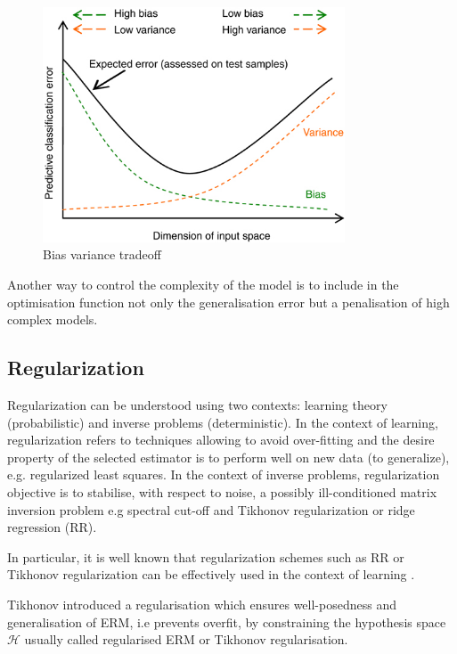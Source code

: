 \begin{figure}[!h]
  \centering
  \includegraphics[width=0.8\textwidth]{img/biasvariancetradeoff}
  \caption{Bias variance tradeoff}
  \label{fig:bvtradeoff}
\end{figure}

Another way to control the complexity of the model is to include in the optimisation function not only the generalisation error but a penalisation of high complex models. 


\subsection{Regularization}\label{sec:regularization}

Regularization can be understood using two contexts: learning theory
(probabilistic) and inverse problems (deterministic). In the context of
learning, regularization refers to techniques allowing to avoid over-fitting and
the desire property of the selected estimator is to perform well on new data (to
generalize), e.g. regularized least squares. In the context of inverse problems,
regularization objective is to stabilise, with respect to noise, a possibly
ill-conditioned matrix inversion problem e.g spectral cut-off and Tikhonov
regularization or ridge regression (RR)\cite{ tikhonov1977}.

In particular, it is well known that regularization schemes such as RR or
Tikhonov regularization can be effectively used in the context of learning
\cite{vito2005}.

Tikhonov introduced a regularisation which ensures well-posedness and
generalisation of ERM, i.e prevents overfit, by constraining the hypothesis
space $\mathcal{H}$ usually called regularised ERM or Tikhonov regularisation.


